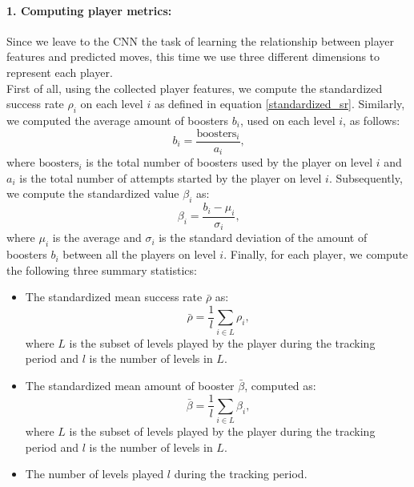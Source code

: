 \paragraph{1. Computing player metrics:}
Since we leave to the \acs{CNN} the task of learning the relationship between player features and predicted moves, this time we use three different dimensions to represent each player. \\
First of all, using the collected player features, we compute the standardized success rate $\rho_{i}$ on each level $i$ as defined in equation \ref{standardized_sr}. Similarly, we computed the average amount of boosters $b_i$, used on each level $i$, as follows:
\begin{equation}
      b_i  = \frac{\text{boosters}_i}{a_i} \text{,}
\end{equation}
where $\text{boosters}_i$ is the total number of boosters used by the player on level $i$ and $a_i$ is the total number of attempts started by the player on level $i$. Subsequently, we compute the standardized value $\beta_i$ as:
\begin{equation}
       \beta_i  = \frac{b_i - \mu_i }{\sigma_i} \text{,}
\end{equation}
where $\mu_i$ is the average and $\sigma_i$ is the standard deviation of the amount of boosters $b_i$ between all the players on level $i$.
Finally, for each player, we compute the following three summary statistics:
\begin{itemize}
    \item The standardized mean success rate $\bar{\rho}$ as:
        \begin{equation}
            \bar{\rho}  = \frac{1}{l} \sum_{i \in L} \rho_i \text{,}
        \end{equation}
    where $L$ is the subset of levels played by the player during the tracking period and $l$ is the number of levels in $L$.
    \item The standardized mean amount of booster $\bar{\beta}$, computed as:
        \begin{equation}
            \bar{\beta} = \frac{1}{l} \sum_{i \in L} \beta_i \text{,}
        \end{equation}
    where $L$ is the subset of levels played by the player during the tracking period and $l$ is the number of levels in $L$.
    \item The number of levels played $l$ during the tracking period.
\end{itemize}

